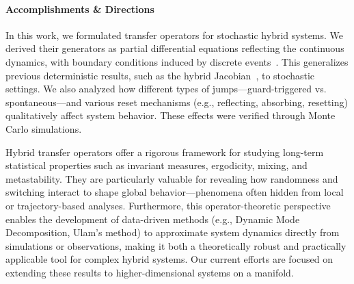 \documentclass[letterpaper,11pt]{article}
\begin{document}
\paragraph{Accomplishments \& Directions}

In this work, we formulated transfer operators for stochastic hybrid systems.
We derived their generators as partial differential equations reflecting the continuous dynamics, with boundary conditions induced by discrete events~\cite{stochastic-hybrid}.
This generalizes previous deterministic results, such as the hybrid Jacobian~\cite{OpSh_fp}, to stochastic settings.
We also analyzed how different types of jumps—guard-triggered vs. spontaneous—and various reset mechanisms (e.g., reflecting, absorbing, resetting) qualitatively affect system behavior.
These effects were verified through Monte Carlo simulations.

Hybrid transfer operators offer a rigorous framework for studying long-term statistical properties such as invariant measures, ergodicity, mixing, and metastability.
They are particularly valuable for revealing how randomness and switching interact to shape global behavior—phenomena often hidden from local or trajectory-based analyses.
Furthermore, this operator-theoretic perspective enables the development of data-driven methods (e.g., Dynamic Mode Decomposition, Ulam’s method) to approximate system dynamics directly from simulations or observations, making it both a theoretically robust and practically applicable tool for complex hybrid systems.
Our current efforts are focused on extending these results to higher-dimensional systems on a manifold.

\end{document}
